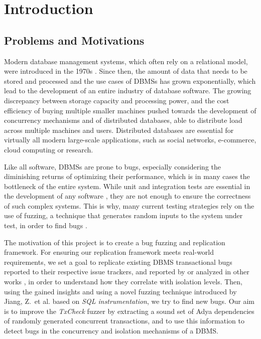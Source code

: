 \newcommand{\package}{\emph}

\chapter{Introduction}
\label{chap:introduction}
\section{Problems and Motivations}

Modern database management systems, which often rely on a relational model, were introduced in the 1970s \cite{codd1970relational}. Since then, the amount of data that needs to be stored and processed and the use cases of DBMSs has grown exponentially, which lead to the development of an entire industry of database software.
The growing discrepancy between storage capacity and processing power, and the cost efficiency of buying multiple smaller machines \cite{barroso2022datacenter} pushed towards the development of concurrency mechanisms and of distributed databases, able to distribute load across multiple machines and users. Distributed databases are essential for virtually all modern large-scale applications, such as social networks, e-commerce, cloud computing or research.

Like all software, DBMSs are prone to bugs, especially considering the diminishing returns of optimizing their performance, which is in many cases the bottleneck of the entire system. While unit and integration tests are essential in the development of any software \cite{testimblogtests}, they are not enough to ensure the correctness of such complex systems. This is why, many current testing strategies rely on the use of fuzzing, a technique that generates random inputs to the system under test, in order to find bugs \cite{liang2018fuzzing}.

The motivation of this project is to create a bug fuzzing and replication framework. For ensuring our replication framework meets real-world requirements, we set a goal to replicate existing DBMS transactional bugs reported to their respective issue trackers, and reported by or analyzed in other works \cite{jiang2023detecting, cui2022differentially_ASE2022, dou2023detecting_ICSE2023, cui2024understanding_ICSE2024}, in order to understand how they correlate with isolation levels. Then, using the gained insights and using a novel fuzzing technique introduced by Jiang, Z.\ et al. \cite{jiang2023detecting} based on \textit{SQL instrumentation}, we try to find new bugs. Our aim is to improve the \textit{TxCheck} fuzzer \cite{jiang2023detecting} by extracting a sound set of Adya dependencies \cite{adya1999weak} of randomly generated concurrent transactions, and to use this information to detect bugs in the concurrency and isolation mechanisms of a DBMS.




